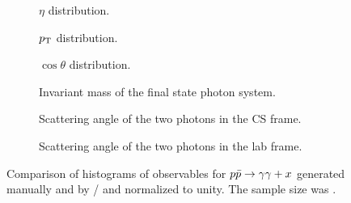 \begin{figure}[hp]
  \centering
  \begin{subfigure}{.49\textwidth}
    \centering {}
    \caption{\label{fig:pdf-eta} \(\eta\)
      distribution.}
  \end{subfigure}
  \begin{subfigure}{.49\textwidth}
    \centering {}
    \caption{\label{fig:pdf-pt} \(p_\mathrm{T}\)
      distribution.}
  \end{subfigure}
  \begin{subfigure}{.49\textwidth}
    \centering {}
    \caption{\label{fig:pdf-cos-theta} \(\cos\theta\)
      distribution.}
  \end{subfigure}
  \begin{subfigure}{.49\textwidth}
    \centering {}
    \caption[Histogram of the invariant mass of the final state photon
    system.]{\label{fig:pdf-inv-m} Invariant mass of the
      final state photon system. %
    }
  \end{subfigure}
  \begin{subfigure}{.49\textwidth}
    \centering {}
    \caption{\label{fig:pdf-o-angle-cs} Scattering angle of the two
      photons in the CS frame.}
  \end{subfigure}
  \begin{subfigure}{.49\textwidth}
    \centering {}
    \caption{\label{fig:pdf-o-angle} Scattering
      angle of the two photons in the lab frame.}
  \end{subfigure}
  \caption{\label{fig:pdf-histos}Comparison of histograms of
    observables for \(p\bar{p}\rightarrow\gamma\gamma + x\) generated manually and by \sherpa/\rivet
    and normalized to unity. The sample size was \protect
    . }
\end{figure}

